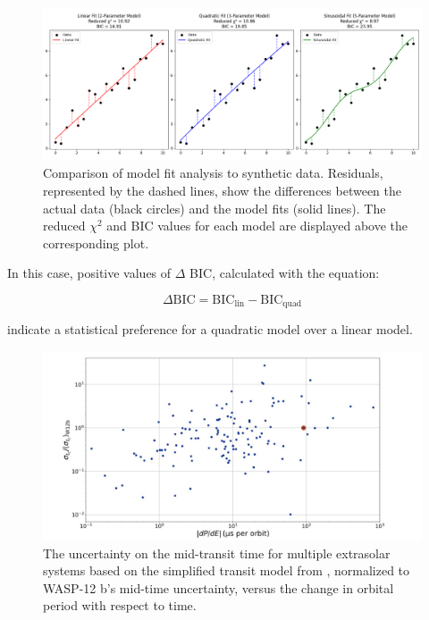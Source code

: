 \documentclass[oneside,12pt]{amsart}
\numberwithin{page}{section}
\begin{document}
\begin{figure}[htbp]
    \centering
    \includegraphics[width=\linewidth]{figs/reduced_chi_squared.png}
    \caption{Comparison of model fit analysis to synthetic data. Residuals, represented by the dashed lines, show the differences between the actual data (black circles) and the model fits (solid lines). The reduced $\chi^2$ and BIC values for each model are displayed above the corresponding plot.}
    \label{fig:reduced-chi-squared}
\end{figure}

In this case, positive values of $\Delta$ BIC, calculated with the equation:

\begin{equation}
    \Delta \text{BIC} = \text{BIC}_{\text{lin}} - \text{BIC}_{\text{quad}}
\end{equation}

indicate a statistical preference for a quadratic model over a linear model.

\begin{figure}[htbp]
    \centering
    \includegraphics[width=\linewidth]{figs/jackson_fig1.png}
    \caption{The uncertainty on the mid-transit time for multiple extrasolar systems based on the simplified transit model from \citet{carter2008analytic}, normalized to WASP-12 b's mid-time uncertainty, versus the change in orbital period with respect to time.}
    \label{fig:jackson-fig1}
\end{figure}
\end{document}
